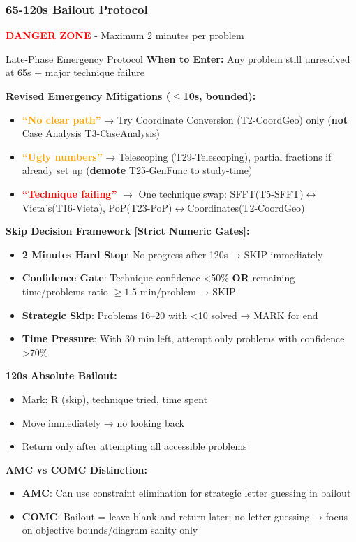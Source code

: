 \documentclass{article}
\begin{document}
\subsubsection{65-120s Bailout Protocol}
{\footnotesize\textcolor{timegreen}{}}\quad\textbf{\textcolor{red}{DANGER ZONE}} - Maximum 2 minutes per problem

\begin{classifybox}{Late-Phase Emergency Protocol}
\textbf{When to Enter:} Any problem still unresolved at 65s + major technique failure

\textbf{Revised Emergency Mitigations ($\leq$10s, bounded):}
\begin{itemize}[nosep]
\item \textcolor{orange}{\textbf{``No clear path''}} → Try Coordinate Conversion (T2-CoordGeo) only (\textbf{not} Case Analysis T3-CaseAnalysis)
\item \textcolor{orange}{\textbf{``Ugly numbers''}} → Telescoping (T29-Telescoping), partial fractions if already set up (\textbf{demote} T25-GenFunc to study-time)
\item \textcolor{red}{\textbf{``Technique failing''}} $\rightarrow$ One technique swap: SFFT(T5-SFFT)$\leftrightarrow$Vieta's(T16-Vieta), PoP(T23-PoP)$\leftrightarrow$Coordinates(T2-CoordGeo)
\end{itemize}

\textbf{Skip Decision Framework [Strict Numeric Gates]:}
\begin{itemize}[nosep]
\item \textbf{2 Minutes Hard Stop}: No progress after 120s → \colorbox{red!20}{SKIP} immediately
\item \textbf{Confidence Gate}: Technique confidence <50\% \textbf{OR} remaining time/problems ratio $\geq1.5$ min/problem → \colorbox{red!20}{SKIP}
\item \textbf{Strategic Skip}: Problems 16--20 with <10 solved → \colorbox{yellow!20}{MARK} for end
\item \textbf{Time Pressure}: With 30 min left, attempt only problems with confidence >70\%
\end{itemize}

\textbf{120s Absolute Bailout:}
\begin{itemize}[nosep]
\item Mark: \colorbox{red!20}{R} (skip), technique tried, time spent
\item Move immediately → no looking back
\item Return only after attempting all accessible problems
\end{itemize}

\textbf{AMC vs COMC Distinction:}
\begin{itemize}[nosep]
\item \textbf{AMC}: Can use constraint elimination for strategic letter guessing in bailout
\item \textbf{COMC}: Bailout = leave blank and return later; no letter guessing → focus on objective bounds/diagram sanity only
\end{itemize}
\end{classifybox}
\end{document}
